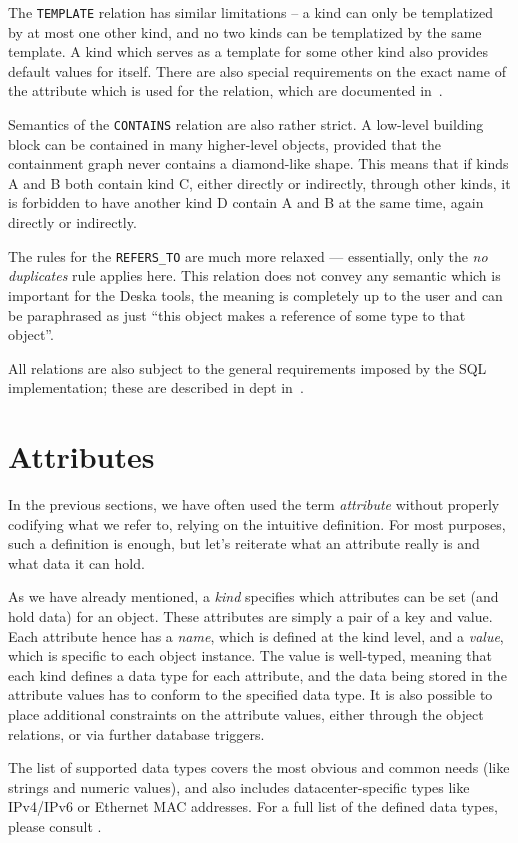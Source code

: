 \documentclass[deska]{subfiles}
\begin{document}
The {\tt TEMPLATE} relation has similar limitations -- a kind can only be templatized by at most one other kind, and no
two kinds can be templatized by the same template.  A kind which serves as a template for some other kind also provides
default values for itself. There are also special requirements on the exact name of the attribute which is used for the
relation, which are documented in~.

Semantics of the {\tt CONTAINS} relation are also rather strict.  A low-level building block can be contained in many
higher-level objects, provided that the containment graph never contains a diamond-like shape.  This means that if kinds
A and B both contain kind C, either directly or indirectly, through other kinds, it is forbidden to have another kind D
contain A and B at the same time, again directly or indirectly.

The rules for the {\tt REFERS\_TO} are much more relaxed --- essentially, only the {\em no duplicates} rule applies here.
This relation does not convey any semantic which is important for the Deska tools, the meaning is completely up to the
user and can be paraphrased as just ``this object makes a reference of some type to that object''.

All relations are also subject to the general requirements imposed by the SQL implementation; these are described in
dept in~.

\section{Attributes}

In the previous sections, we have often used the term {\em attribute} without properly codifying what we refer to,
relying on the intuitive definition.  For most purposes, such a definition is enough, but let's reiterate what an
attribute really is and what data it can hold.

As we have already mentioned, a {\em kind} specifies which attributes can be set (and hold data) for an object.  These
attributes are simply a pair of a key and value.  Each attribute hence has a {\em name}, which is defined at the kind
level, and a {\em value}, which is specific to each object instance.  The value is well-typed, meaning that each kind
defines a data type for each attribute, and the data being stored in the attribute values has to conform to the
specified data type.  It is also possible to place additional constraints on the attribute values, either through the
object relations, or via further database triggers.

The list of supported data types covers the most obvious and common needs (like strings and numeric values), and also
includes datacenter-specific types like IPv4/IPv6 or Ethernet MAC addresses.  For a full list of the defined data types,
please consult .
\end{document}
